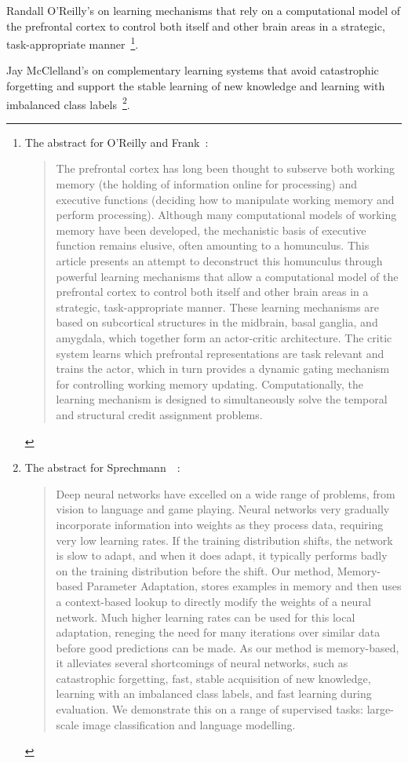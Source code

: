 Randall O'Reilly's {} on learning mechanisms that rely on a computational model of the prefrontal cortex to control both itself and other brain areas in a strategic, task-appropriate manner~\cite{OReillyandFrankNC-06}\footnote{%
%
  The abstract for O'Reilly and Frank~\cite{OReillyandFrankNC-06}:
%
  \begin{quotation}
%
   The prefrontal cortex has long been thought to subserve both working memory (the holding of information online for processing) and executive functions (deciding how to manipulate working memory and perform processing). Although many computational models of working memory have been developed, the mechanistic basis of executive function remains elusive, often amounting to a homunculus. This article presents an attempt to deconstruct this homunculus through powerful learning mechanisms that allow a computational model of the prefrontal cortex to control both itself and other brain areas in a strategic, task-appropriate manner. These learning mechanisms are based on subcortical structures in the midbrain, basal ganglia, and amygdala, which together form an actor-critic architecture. The critic system learns which prefrontal representations are task relevant and trains the actor, which in turn provides a dynamic gating mechanism for controlling working memory updating. Computationally, the learning mechanism is designed to simultaneously solve the temporal and structural credit assignment problems.
%
  \end{quotation}}.

Jay McClelland's {} on complementary learning systems that avoid catastrophic forgetting and support the stable learning of new knowledge and learning with imbalanced class labels~\cite{SprechmannetalICLR-18}\footnote{%
%
  The abstract for Sprechmann~\etal{}~\cite{SprechmannetalICLR-18}:
%
  \begin{quotation}
%
   Deep neural networks have excelled on a wide range of problems, from vision to language and game playing. Neural networks very gradually incorporate information into weights as they process data, requiring very low learning rates. If the training distribution shifts, the network is slow to adapt, and when it does adapt, it typically performs badly on the training distribution before the shift. Our method, Memory-based Parameter Adaptation, stores examples in memory and then uses a context-based lookup to directly modify the weights of a neural network. Much higher learning rates can be used for this local adaptation, reneging the need for many iterations over similar data before good predictions can be made. As our method is memory-based, it alleviates several shortcomings of neural networks, such as catastrophic forgetting, fast, stable acquisition of new knowledge, learning with an imbalanced class labels, and fast learning during evaluation. We demonstrate this on a range of supervised tasks: large-scale image classification and language modelling.
%
  \end{quotation}}.

